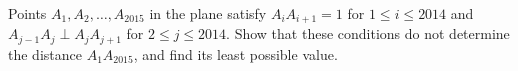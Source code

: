 Points $A_1,A_2,\dots,A_{2015}$ in the plane satisfy $A_iA_{i+1}=1$ for $1\le i\le2014$ and $A_{j-1}A_j\perp A_jA_{j+1}$ for $2\le j\le2014$. Show that these conditions do not determine the distance $A_1A_{2015}$, and find its least possible value.
